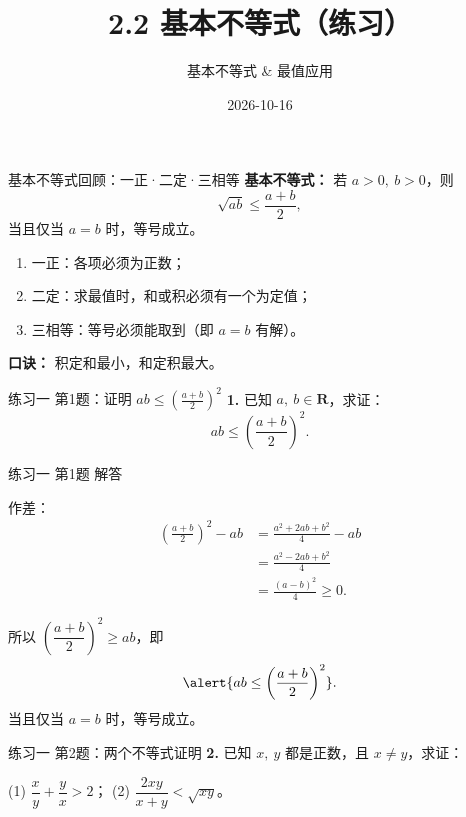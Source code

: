 \documentclass[10pt,aspectratio=169,serif]{beamer}
\title[2.2 基本不等式·练习]{2.2 基本不等式（练习）}
\subtitle{基本不等式 \& 最值应用}
\author{}
\institute{}
\date{2026-10-16}
\begin{document}
\begin{frame}
  \titlepage
\end{frame}

\begin{frame}[t]{基本不等式回顾：一正·二定·三相等}
\centering
\textbf{基本不等式：} 若 $a>0,\ b>0$，则
\[
\sqrt{ab} \le \frac{a+b}{2},
\]
当且仅当 $a=b$ 时，等号成立。

\vspace{1em}
\begin{tcolorbox}[colback=blue!5,colframe=blue,title=\textbf{使用条件：一正、二定、三相等}]
\begin{enumerate}
  \item \alert{一正}：各项必须为正数；
  \item \alert{二定}：求最值时，和或积必须有一个为定值；
  \item \alert{三相等}：等号必须能取到（即 $a=b$ 有解）。
\end{enumerate}
\small
\textbf{口诀：} 积定和最小，和定积最大。
\end{tcolorbox}
\end{frame}

\begin{frame}[t]{练习一 第1题：证明 $ab\le\left(\frac{a+b}{2}\right)^2$}
\textbf{1.} 已知 $a,\ b\in\mathbf{R}$，求证：
\[
ab \le \left(\frac{a+b}{2}\right)^2.
\]
\end{frame}

\begin{frame}[t]{练习一 第1题 解答}
\begin{tcolorbox}[colback=orange!10,colframe=orange,title=\textbf{证明}]
作差：
\begin{align*}
\left(\frac{a+b}{2}\right)^2 - ab
&= \frac{a^2+2ab+b^2}{4} - ab\\
&= \frac{a^2 - 2ab + b^2}{4}\\
&= \frac{(a-b)^2}{4} \ge 0.
\end{align*}

所以 $\left(\dfrac{a+b}{2}\right)^2 \ge ab$，即
\[
\alert{ab \le \left(\frac{a+b}{2}\right)^2}.
\]
当且仅当 $a=b$ 时，等号成立。
\end{tcolorbox}
\end{frame}

\begin{frame}[t]{练习一 第2题：两个不等式证明}
\textbf{2.} 已知 $x,\ y$ 都是正数，且 $x\ne y$，求证：

\vspace{0.5em}
(1) $\dfrac{x}{y}+\dfrac{y}{x}>2$；\qquad
(2) $\dfrac{2xy}{x+y}<\sqrt{xy}$。
\end{frame}
\end{document}

